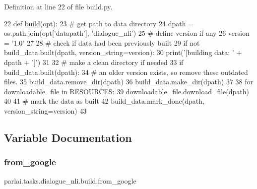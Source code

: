 Definition at line 22 of file build.\+py.


\begin{DoxyCode}
22 \textcolor{keyword}{def }\hyperlink{namespacedialog__babi__feedback_1_1build_a7a9d289f7493a5ded13c4b7f071b6184}{build}(opt):
23     \textcolor{comment}{# get path to data directory}
24     dpath = os.path.join(opt[\textcolor{stringliteral}{'datapath'}], \textcolor{stringliteral}{'dialogue\_nli'})
25     \textcolor{comment}{# define version if any}
26     version = \textcolor{stringliteral}{'1.0'}
27 
28     \textcolor{comment}{# check if data had been previously built}
29     \textcolor{keywordflow}{if} \textcolor{keywordflow}{not} build\_data.built(dpath, version\_string=version):
30         print(\textcolor{stringliteral}{'[building data: '} + dpath + \textcolor{stringliteral}{']'})
31 
32         \textcolor{comment}{# make a clean directory if needed}
33         \textcolor{keywordflow}{if} build\_data.built(dpath):
34             \textcolor{comment}{# an older version exists, so remove these outdated files.}
35             build\_data.remove\_dir(dpath)
36         build\_data.make\_dir(dpath)
37 
38         \textcolor{keywordflow}{for} downloadable\_file \textcolor{keywordflow}{in} RESOURCES:
39             downloadable\_file.download\_file(dpath)
40 
41         \textcolor{comment}{# mark the data as built}
42         build\_data.mark\_done(dpath, version\_string=version)
43 \end{DoxyCode}


\subsection{Variable Documentation}
\mbox{\label{namespaceparlai_1_1tasks_1_1dialogue__nli_1_1build_a61d2bfe776ece7e677e42e59a6113ef9}} 
\subsubsection{\texorpdfstring{from\+\_\+google}{from\_google}}
{\footnotesize\ttfamily parlai.\+tasks.\+dialogue\+\_\+nli.\+build.\+from\+\_\+google}



